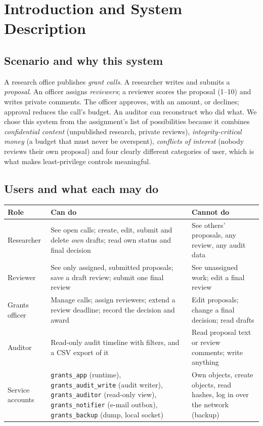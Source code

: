 \documentclass[10pt,a4paper]{article}
\newcommand{\code}[1]{\nolinkurl{#1}}
\newcommand{\tcap}[1]{\captionof{table}{#1}\nopagebreak[4]\vspace{-3pt}}
\begin{document}
\section{Introduction and System Description}\label{sec:intro}

\subsection{Scenario and why this system}
A research office publishes \emph{grant calls}. A researcher writes and submits a \emph{proposal}. An officer assigns \emph{reviewers}; a reviewer scores the proposal (1--10) and writes private comments. The officer approves, with an amount, or declines; approval reduces the call's budget. An auditor can reconstruct who did what. We chose this system from the assignment's list of possibilities because it combines \emph{confidential content} (unpublished research, private reviews), \emph{integrity-critical money} (a budget that must never be overspent), \emph{conflicts of interest} (nobody reviews their own proposal) and four clearly different categories of user, which is what makes least-privilege controls meaningful.

\subsection{Users and what each may do}
\tcap{Users and what each role may do}
\begin{center}\small
\begin{tabularx}{\linewidth}{@{}L{2.5cm}YY@{}}
\toprule\textbf{Role} & \textbf{Can do} & \textbf{Cannot do}\\\midrule
Researcher & See open calls; create, edit, submit and delete \emph{own} drafts; read own status and final decision & See others' proposals, any review, any audit data\\
Reviewer & See only assigned, submitted proposals; save a draft review; submit one final review & See unassigned work; edit a final review\\
Grants officer & Manage calls; assign reviewers; extend a review deadline; record the decision and award & Edit proposals; change a final decision; read drafts\\
Auditor & Read-only audit timeline with filters, and a CSV export of it & Read proposal text or review comments; write anything\\
Service accounts & \code{grants_app} (runtime), \code{grants_audit_write} (audit writer), \code{grants_auditor} (read-only view), \code{grants_notifier} (e-mail outbox), \code{grants_backup} (dump, local socket) & Own objects, create objects, read hashes, log in over the network (backup)\\
\bottomrule\end{tabularx}\end{center}
\end{document}
